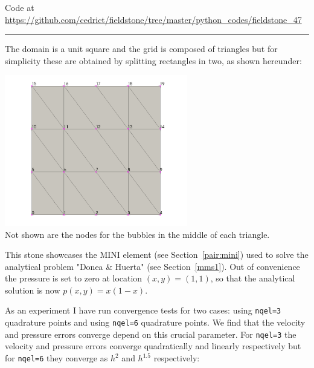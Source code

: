 

\begin{center}
Code at \url{https://github.com/cedrict/fieldstone/tree/master/python_codes/fieldstone_47}
\end{center}

\par\noindent\rule{\textwidth}{0.4pt}

The domain is a unit square and the grid is composed of triangles but for simplicity these 
are obtained by splitting rectangles in two, as shown hereunder:

\begin{center}
\includegraphics[width=8cm]{python_codes/fieldstone_47/images/minigrid}\\
Not shown are the nodes for the bubbles in the middle of each triangle. 
\end{center}

This stone showcases the MINI element (see Section~\ref{pair:mini})
used to solve the analytical problem "Donea \& Huerta" (see Section~\ref{mms1}).
Out of convenience the pressure is set to zero at location $(x,y)=(1,1)$, so that the 
analytical solution is now $p(x,y)=x(1-x)$. 

As an experiment I have run convergence tests for two cases: using {\tt nqel=3} 
quadrature points and using {\tt nqel=6} quadrature points.
We find that the velocity and pressure errors converge depend on this crucial
parameter. 
For {\tt nqel=3} the velocity and pressure errors converge quadratically and linearly respectively
but for {\tt nqel=6} they converge as $h^2$ and $h^{1.5}$ respectively:

